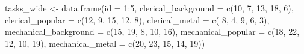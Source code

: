 \documentclass[
]{article}
\newenvironment{Shaded}{\begin{snugshade}}{\end{snugshade}}
\newcommand{\AttributeTok}[1]{\textcolor[rgb]{0.77,0.63,0.00}{#1}}
\newcommand{\DecValTok}[1]{\textcolor[rgb]{0.00,0.00,0.81}{#1}}
\newcommand{\FunctionTok}[1]{\textcolor[rgb]{0.00,0.00,0.00}{#1}}
\newcommand{\NormalTok}[1]{#1}
\newcommand{\OtherTok}[1]{\textcolor[rgb]{0.56,0.35,0.01}{#1}}
\newcommand{\SpecialCharTok}[1]{\textcolor[rgb]{0.00,0.00,0.00}{#1}}
\begin{document}
\begin{Shaded}
\begin{Highlighting}[]
\NormalTok{tasks\_wide }\OtherTok{\textless{}{-}} \FunctionTok{data.frame}\NormalTok{(}\AttributeTok{id =} \DecValTok{1}\SpecialCharTok{:}\DecValTok{5}\NormalTok{,}
                         \AttributeTok{clerical\_background   =} \FunctionTok{c}\NormalTok{(}\DecValTok{10}\NormalTok{,  }\DecValTok{7}\NormalTok{, }\DecValTok{13}\NormalTok{, }\DecValTok{18}\NormalTok{,  }\DecValTok{6}\NormalTok{),}
                         \AttributeTok{clerical\_popular      =} \FunctionTok{c}\NormalTok{(}\DecValTok{12}\NormalTok{,  }\DecValTok{9}\NormalTok{, }\DecValTok{15}\NormalTok{, }\DecValTok{12}\NormalTok{,  }\DecValTok{8}\NormalTok{),}
                         \AttributeTok{clerical\_metal        =} \FunctionTok{c}\NormalTok{( }\DecValTok{8}\NormalTok{,  }\DecValTok{4}\NormalTok{,  }\DecValTok{9}\NormalTok{,  }\DecValTok{6}\NormalTok{,  }\DecValTok{3}\NormalTok{),}
                         \AttributeTok{mechanical\_background =} \FunctionTok{c}\NormalTok{(}\DecValTok{15}\NormalTok{, }\DecValTok{19}\NormalTok{,  }\DecValTok{8}\NormalTok{, }\DecValTok{10}\NormalTok{, }\DecValTok{16}\NormalTok{),}
                         \AttributeTok{mechanical\_popular    =} \FunctionTok{c}\NormalTok{(}\DecValTok{18}\NormalTok{, }\DecValTok{22}\NormalTok{, }\DecValTok{12}\NormalTok{, }\DecValTok{10}\NormalTok{, }\DecValTok{19}\NormalTok{),}
                         \AttributeTok{mechanical\_metal      =} \FunctionTok{c}\NormalTok{(}\DecValTok{20}\NormalTok{, }\DecValTok{23}\NormalTok{, }\DecValTok{15}\NormalTok{, }\DecValTok{14}\NormalTok{, }\DecValTok{19}\NormalTok{))}


\end{Highlighting}
\end{Shaded}
\end{document}
